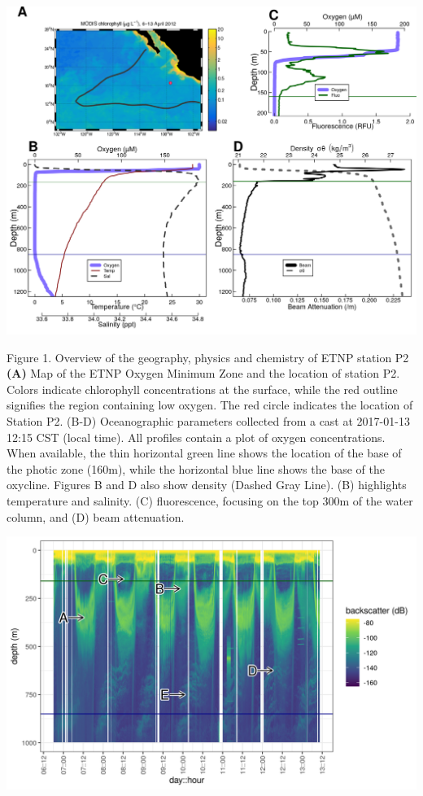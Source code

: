 \documentclass[]{article}
\begin{document}
\includegraphics{../figures/CombinedP2Info.png}

Figure 1. Overview of the geography, physics and chemistry of ETNP
station P2 \textbf{(A)} Map of the ETNP Oxygen Minimum Zone and the
location of station P2. Colors indicate chlorophyll concentrations at
the surface, while the red outline signifies the region containing low
oxygen. The red circle indicates the location of Station P2. (B-D)
Oceanographic parameters collected from a cast at 2017-01-13 12:15 CST
(local time). All profiles contain a plot of oxygen concentrations. When
available, the thin horizontal green line shows the location of the base
of the photic zone (160m), while the horizontal blue line shows the base
of the oxycline. Figures B and D also show density (Dashed Gray Line).
(B) highlights temperature and salinity. (C) fluorescence, focusing on
the top 300m of the water column, and (D) beam attenuation.

\includegraphics{../figures/stationP2_EK60_18kOnly.png}
\end{document}
